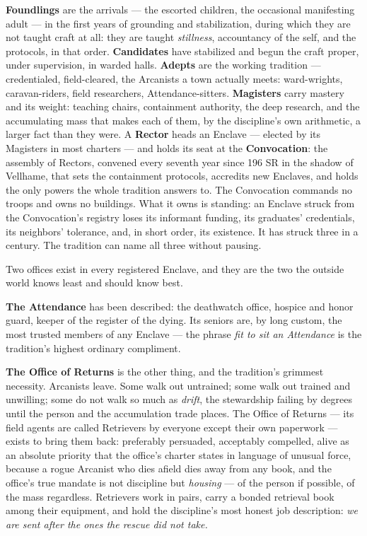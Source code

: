 \textbf{Foundlings} are the arrivals --- the escorted children, the occasional manifesting adult --- in the first years of grounding and stabilization, during which they are not taught craft at all: they are taught \textit{stillness}, accountancy of the self, and the protocols, in that order. \textbf{Candidates} have stabilized and begun the craft proper, under supervision, in warded halls. \textbf{Adepts} are the working tradition --- credentialed, field-cleared, the Arcanists a town actually meets: ward-wrights, caravan-riders, field researchers, Attendance-sitters. \textbf{Magisters} carry mastery and its weight: teaching chairs, containment authority, the deep research, and the accumulating mass that makes each of them, by the discipline's own arithmetic, a larger fact than they were. A \textbf{Rector} heads an Enclave --- elected by its Magisters in most charters --- and holds its seat at the \textbf{Convocation}: the assembly of Rectors, convened every seventh year since 196 SR in the shadow of Vellhame, that sets the containment protocols, accredits new Enclaves, and holds the only powers the whole tradition answers to. The Convocation commands no troops and owns no buildings. What it owns is standing: an Enclave struck from the Convocation's registry loses its informant funding, its graduates' credentials, its neighbors' tolerance, and, in short order, its existence. It has struck three in a century. The tradition can name all three without pausing.

Two offices exist in every registered Enclave, and they are the two the outside world knows least and should know best.

\textbf{The Attendance} has been described: the deathwatch office, hospice and honor guard, keeper of the register of the dying. Its seniors are, by long custom, the most trusted members of any Enclave --- the phrase \textit{fit to sit an Attendance} is the tradition's highest ordinary compliment.

\textbf{The Office of Returns} is the other thing, and the tradition's grimmest necessity. Arcanists leave. Some walk out untrained; some walk out trained and unwilling; some do not walk so much as \textit{drift}, the stewardship failing by degrees until the person and the accumulation trade places. The Office of Returns --- its field agents are called Retrievers by everyone except their own paperwork --- exists to bring them back: preferably persuaded, acceptably compelled, alive as an absolute priority that the office's charter states in language of unusual force, because a rogue Arcanist who dies afield dies away from any book, and the office's true mandate is not discipline but \textit{housing} --- of the person if possible, of the mass regardless. Retrievers work in pairs, carry a bonded retrieval book among their equipment, and hold the discipline's most honest job description: \textit{we are sent after the ones the rescue did not take.}

